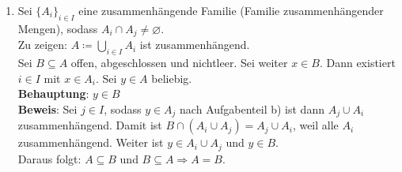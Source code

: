 \begin{solution}
\begin{enumerate}[label= (\alph*)]
    \item Sei \( {\{ A_i \}}_{i \in I} \) eine zusammenhängende Familie (Familie zusammenhängender Mengen), sodass 
    \( A_i \cap A_j \neq \varnothing \). \\ 
    Zu zeigen: \( A \coloneqq \bigcup_{i \in I} A_i \) ist zusammenhängend. \\
    Sei \( B \subseteq A \) offen, abgeschlossen und nichtleer. Sei weiter \( x \in B \). Dann existiert \( i \in I \) mit
    \( x \in A_i \). Sei \( y \in A \) beliebig. \\
    \textbf{Behauptung}: \( y \in B \) \\
    \textbf{Beweis}: Sei \( j \in I \), sodass \( y \in A_j \) nach Aufgabenteil b) ist dann \( A_j \cup A_i \) zusammenhängend. Damit ist \( B \cap (A_i \cup A_j) = A_j \cup A_i \), weil alle \( A_i \) zusammenhängend.
    Weiter ist \( y \in A_i \cup A_j \) und \( y \in B \). \\
    Daraus folgt: \( A \subseteq B \) und \( B \subseteq A \Rightarrow A = B \).
  \end{enumerate}
\end{solution}

